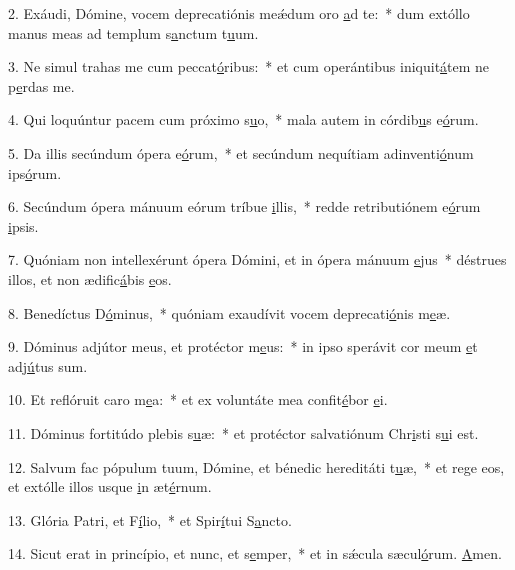 2. Exáudi, Dómine, vocem deprecatiónis meǽdum oro \uline{a}d te:~* dum extóllo manus meas ad templum s\uline{a}nctum t\uline{u}um.\par 
3. Ne simul trahas me cum peccat\uline{ó}ribus:~* et cum operántibus iniquit\uline{á}tem ne p\uline{e}rdas me.\par 
4. Qui loquúntur pacem cum próximo s\uline{u}o,~* mala autem in córdib\uline{u}s e\uline{ó}rum.\par 
5. Da illis secúndum ópera e\uline{ó}rum,~* et secúndum nequítiam adinventi\uline{ó}num ips\uline{ó}rum.\par 
6. Secúndum ópera mánuum eórum tríbue \uline{i}llis,~* redde retributiónem e\uline{ó}rum \uline{i}psis.\par 
7. Quóniam non intellexérunt ópera Dómini, et in ópera mánuum \uline{e}jus~* déstrues illos, et non ædific\uline{á}bis \uline{e}os.\par 
8. Benedíctus D\uline{ó}minus,~* quóniam exaudívit vocem deprecati\uline{ó}nis m\uline{e}æ.\par 
9. Dóminus adjútor meus, et protéctor m\uline{e}us:~* in ipso sperávit cor meum \uline{e}t adj\uline{ú}tus sum.\par 
10. Et reflóruit caro m\uline{e}a:~* et ex voluntáte mea confit\uline{é}bor \uline{e}i.\par 
11. Dóminus fortitúdo plebis s\uline{u}æ:~* et protéctor salvatiónum Chr\uline{i}sti s\uline{u}i est.\par 
12. Salvum fac pópulum tuum, Dómine, et bénedic hereditáti t\uline{u}æ,~* et rege eos, et extólle illos usque \uline{i}n æt\uline{é}rnum.\par 
13. Glória Patri, et F\uline{í}lio,~* et Spir\uline{í}tui S\uline{a}ncto.\par 
14. Sicut erat in princípio, et nunc, et s\uline{e}mper,~* et in sǽcula sæcul\uline{ó}rum. \uline{A}men.\par 
